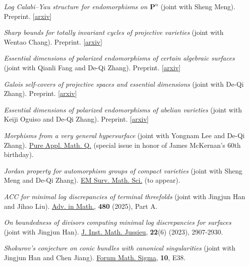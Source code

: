\documentclass[margin,line,pifont,palatino,courier]{res}
\newenvironment{list1}{
  \begin{list}{\ding{113}}{%
      \setlength{\itemsep}{0in}
      \setlength{\parsep}{0in} \setlength{\parskip}{0in}
      \setlength{\topsep}{0in} \setlength{\partopsep}{0in}
      \setlength{\leftmargin}{0.17in}}}{\end{list}}
\begin{document}
\begin{resume}
\begin{list1}
\item \textit{Log Calabi--Yau structure for endomorphisms on $\mathbf{P}^n$} (joint with Sheng Meng). Preprint. [\href{https://arxiv.org/abs/2608.02114}{arxiv}]
\item \textit{Sharp bounds for totally invariant cycles of projective varieties} (joint with Wentao Chang). Preprint. [\href{https://arxiv.org/abs/2607.27738}{arxiv}]
\item \textit{Essential dimensions of polarized endomorphisms of certain algebraic surfaces} (joint with Qianli Fang and De-Qi Zhang). Preprint. [\href{https://arxiv.org/abs/2606.24103}{arxiv}]
\item \textit{Galois self-covers of projective spaces and essential dimensions} (joint with De-Qi Zhang). Preprint. [\href{https://arxiv.org/abs/2606.10207}{arxiv}]
\item \textit{Essential dimensions of polarized endomorphisms of abelian varieties} (joint with Keiji Oguiso and De-Qi Zhang). Preprint. [\href{https://arxiv.org/abs/2512.04942}{arxiv}]
\item \textit{Morphisms from a very general hypersurface} (joint with Yongnam Lee and De-Qi Zhang). \href{https://link.intlpress.com/JFirstDetail/1942307988947648514}{Pure Appl. Math. Q.} (special issue in honor of James McKernan's 60th birthday).
\item \textit{Jordan property for automorphism groups of compact varieties} (joint with Sheng Meng and De-Qi Zhang). \href{https://ems.press/journals/emss/articles/14298864}{EM Surv. Math. Sci.} (to appear).
\item \textit{ACC for minimal log discrepancies of terminal threefolds} (joint with Jingjun Han and Jihao Liu). \href{https://www.sciencedirect.com/science/article/abs/pii/S000187082500355X}{Adv. in Math.}, \textbf{480} (2025), Part A.
\item \textit{On boundedness of divisors computing minimal log discrepancies for surfaces} (joint with Jingjun Han). \href{https://www.cambridge.org/core/journals/journal-of-the-institute-of-mathematics-of-jussieu/article/on-boundedness-of-divisors-computing-minimal-log-discrepancies-for-surfaces/FD39003AD587E4711097363175E6F966}{J. Inst. Math. Jussieu}, \textbf{22}(6) (2023), 2907-2930.
\item \textit{Shokurov's conjecture on conic bundles with canonical singularities} (joint with Jingjun Han and Chen Jiang). \href{https://www.cambridge.org/core/journals/forum-of-mathematics-sigma/article/shokurovs-conjecture-on-conic-bundles-with-canonical-singularities/EC15D79B29D794C1637A2C80EC13DBA8}{Forum Math. Sigma}, \textbf{10}, E38.

\end{list1}
\end{resume}
\end{document}
